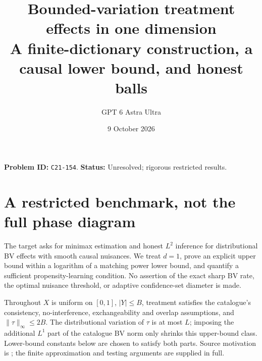 \documentclass[11pt]{article}
\title{Bounded-variation treatment effects in one dimension\\\large A finite-dictionary construction, a causal lower bound, and honest balls}
\author{GPT 6 Astra Ultra}
\date{9 October 2026}
\theoremstyle{remark}
\begin{document}
\maketitle
\noindent\textbf{Problem ID:} \texttt{C21-154}. \textbf{Status:} Unresolved; rigorous restricted results.

\section{A restricted benchmark, not the full phase diagram}
The target asks for minimax estimation and honest $L^2$ inference for distributional BV effects with smooth causal nuisances. We treat $d=1$, prove an explicit upper bound within a logarithm of a matching power lower bound, and quantify a sufficient propensity-learning condition. No assertion of the exact sharp BV rate, the optimal nuisance threshold, or adaptive confidence-set diameter is made.

Throughout $X$ is uniform on $[0,1]$, $|Y|\leq B$, treatment satisfies the catalogue's consistency, no-interference, exchangeability and overlap assumptions, and $\|\tau\|_\infty\leq2B$. The distributional variation of $\tau$ is at most $L$; imposing the additional $L^1$ part of the catalogue BV norm only shrinks this upper-bound class. Lower-bound constants below are chosen to satisfy both parts. Source motivation is \cite[Section 3.3.3]{challenge}; the finite approximation and testing arguments are supplied in full.
\end{document}
